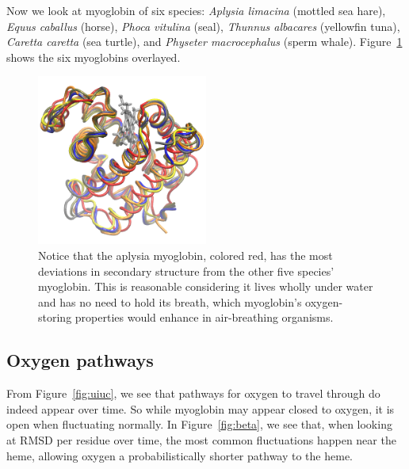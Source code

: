 \documentclass{article}
\begin{document}
Now we look at myoglobin of six species: \textit{Aplysia limacina} (mottled sea hare), \textit{Equus caballus} (horse), \textit{Phoca vitulina} (seal), \textit{Thunnus albacares} (yellowfin tuna), \textit{Caretta caretta} (sea turtle), and \textit{Physeter macrocephalus} (sperm whale).  Figure~\ref{fig:species} shows the six myoglobins overlayed.

\begin{figure}
	\centering
	\includegraphics[width=0.5\textwidth]{multiseq.png}
        \caption{Notice that the aplysia myoglobin, colored red, has the most deviations in secondary structure from the other five species' myoglobin.  This is reasonable considering it lives wholly under water and has no need to hold its breath, which myoglobin's oxygen-storing properties would enhance in air-breathing organisms.}
	\label{fig:species}
\end{figure}


\subsection{Oxygen pathways}

From Figure~\ref{fig:uiuc}, we see that pathways for oxygen to travel through do indeed appear over time.  So while myoglobin may appear closed to oxygen, it is open when fluctuating normally.  In Figure~\ref{fig:beta}, we see that, when looking at RMSD per residue over time, the most common fluctuations happen near the heme, allowing oxygen a probabilistically shorter pathway to the heme.
\end{document}
